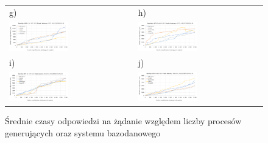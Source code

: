 \begin{figure}[H]
\begin{tabular}{@{}ll@{}}
    g) & h) \\
    \includegraphics[width=0.49\textwidth]{rys05/response-dotnet-updateCourse.pdf} & \includegraphics[width=0.49\textwidth]{rys05/response-nodejs-updateCourse.pdf} \\
    i) & j) \\
    \includegraphics[width=0.49\textwidth]{rys05/response-dotnet-deleteReservation.pdf} & \includegraphics[width=0.49\textwidth]{rys05/response-nodejs-deleteReservation.pdf} \\
	\end{tabular}
  \caption{Średnie czasy odpowiedzi na żądanie względem liczby procesów generujących oraz systemu bazodanowego}
  \label{fig:response-mtc-1}
\end{figure}

